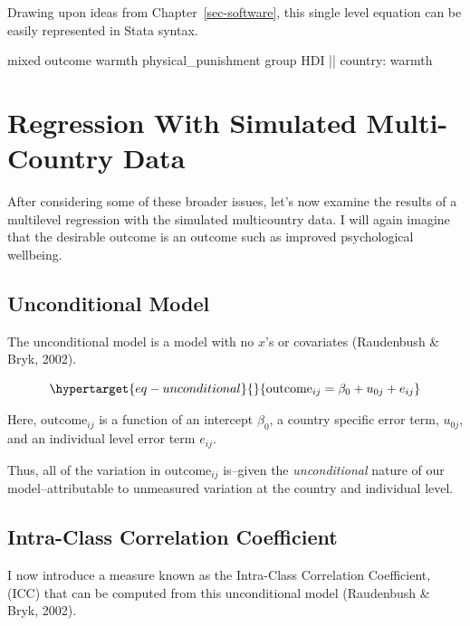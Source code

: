 \documentclass[
  letterpaper,
  DIV=11,
  numbers=noendperiod]{scrreprt}
\newenvironment{Shaded}{\begin{snugshade}}{\end{snugshade}}
\newcommand{\FunctionTok}[1]{\textcolor[rgb]{0.28,0.35,0.67}{#1}}
\newcommand{\NormalTok}[1]{\textcolor[rgb]{0.00,0.23,0.31}{#1}}
\begin{document}
Drawing upon ideas from Chapter~\ref{sec-software}, this single level
equation can be easily represented in Stata syntax.

\begin{Shaded}
\begin{Highlighting}[]

\NormalTok{mixed outcome warmth physical\_punishment }\FunctionTok{group}\NormalTok{ HDI || country: warmth}
\end{Highlighting}
\end{Shaded}

\hypertarget{sec-regression}{%
\section{Regression With Simulated Multi-Country
Data}\label{sec-regression}}

After considering some of these broader issues, let's now examine the
results of a multilevel regression with the simulated multicountry data.
I will again imagine that the desirable outcome is an outcome such as
improved psychological wellbeing.

\hypertarget{sec-unconditional}{%
\subsection{Unconditional Model}\label{sec-unconditional}}

The unconditional model is a model with no \(x\)'s or covariates
(Raudenbush \& Bryk, 2002).

\begin{equation}\protect\hypertarget{eq-unconditional}{}{\text{outcome}_{ij} = \beta_0 + u_{0j} + e_{ij}}\label{eq-unconditional}\end{equation}

Here, \(\text{outcome}_{ij}\) is a function of an intercept \(\beta_0\),
a country specific error term, \(u_{0j}\), and an individual level error
term \(e_{ij}\).

Thus, all of the variation in \(\text{outcome}_{ij}\) is--given the
\emph{unconditional} nature of our model--attributable to unmeasured
variation at the country and individual level.

\hypertarget{sec-ICC}{%
\subsection{Intra-Class Correlation Coefficient}\label{sec-ICC}}

I now introduce a measure known as the Intra-Class Correlation
Coefficient, (ICC) that can be computed from this unconditional model
(Raudenbush \& Bryk, 2002).
\end{document}
